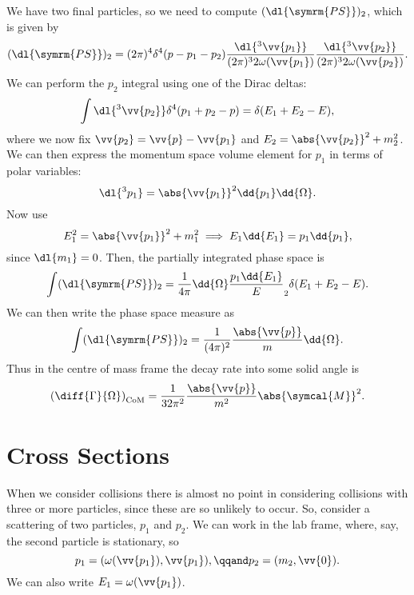 \documentclass[fleqn]{NotesClass}
\newcommand{\amplitude}{\symcal{M}}
\newcommand{\phaseSpaceMeasure}[1][n]{(\dl{\symrm{PS}})_{#1}}
\begin{document}
    We have two final particles, so we need to compute \(\phaseSpaceMeasure[2]\), which is given by
    \begin{equation}
        \phaseSpaceMeasure[2] = (2\pi)^4 \delta^4(p - p_1 - p_2) \frac{\dl{^3\vv{p_1}}}{(2\pi)^32\omega(\vv{p_1})} \frac{\dl{^3\vv{p_2}}}{(2\pi)^32\omega(\vv{p_2})}.
    \end{equation}
    We can perform the \(p_2\) integral using one of the Dirac deltas:
    \begin{equation}
        \int \dl{^3\vv{p_2}} \delta^4(p_1 + p_2 - p) = \delta(E_1 + E_2 - E),
    \end{equation}
    where we now fix \(\vv{p_2} = \vv{p} - \vv{p_1}\) and \(E_2 = \abs{\vv{p_2}}^2 + m_2^2\).
    We can then express the momentum space volume element for \(p_1\) in terms of polar variables:
    \begin{equation}
        \dl{^3p_1} = \abs{\vv{p_1}}^2 \dd{p_1} \dd{\Omega}.
    \end{equation}
    Now use
    \begin{equation}
        E_1^2 = \abs{\vv{p_1}}^2 + m_1^2 \implies E_1 \dd{E_1} = p_1\dd{p_1},
    \end{equation}
    since \(\dl{m_1} = 0\).
    Then, the partially integrated phase space is
    \begin{equation}
        \int \phaseSpaceMeasure[2] = \frac{1}{4\pi} \dd{\Omega} \frac{p_1 \dd{E_1}}E_2{} \delta(E_1 + E_2 - E).
    \end{equation}
    We can then write the phase space measure as
    \begin{equation}
        \int \phaseSpaceMeasure[2] = \frac{1}{(4\pi)^2} \frac{\abs{\vv{p}}}{m} \dd{\Omega}.
    \end{equation}
    Thus in the centre of mass frame the decay rate into some solid angle is
    \begin{equation}
        \left( \diff{\Gamma}{\Omega} \right)_{\text{CoM}} = \frac{1}{32\pi^2} \frac{\abs{\vv{p}}}{m^2} \abs{\amplitude}^2.
    \end{equation}
    
    \section{Cross Sections}
    When we consider collisions there is almost no point in considering collisions with three or more particles, since these are so unlikely to occur.
    So, consider a scattering of two particles, \(p_1\) and \(p_2\).
    We can work in the lab frame, where, say, the second particle is stationary, so
    \begin{equation}
        p_1 = (\omega(\vv{p_1}), \vv{p_1}), \qqand p_2 = (m_2, \vv{0}).
    \end{equation}
    We can also write \(E_1 = \omega(\vv{p_1})\).
    
\end{document}
